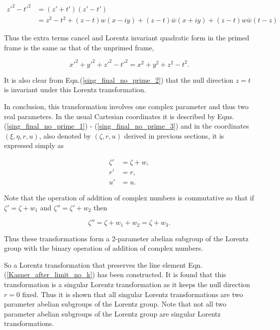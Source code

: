 \begin{align*}
{z'}^2 - {t'}^2 & = (z' + t')(z' - t') \\
& = z^2 - t^2 + (z - t)w(x-iy) + (z-t)\bar{w}(x+iy) + (z -t)w\bar{w}(t-z)
\end{align*}

\noindent Thus the extra terms cancel and Lorentz invariant quadratic form in the primed frame is the same as that of the unprimed frame,

\begin{equation*} 
{x'}^2 + {y'}^2 + {z'}^2 - {t'}^2 = {x}^2 + {y}^2 + {z}^2 - {t}^2.
\end{equation*} 

\noindent It is also clear from Eqn.(\ref{sing_final_no_prime_2}) that the null direction $z = t$ is invariant under this Lorentz transformation.

In conclusion, this transformation involves one complex parameter and thus two real parameters. In the usual Cartesian coordinates it is described by Eqns.(\ref{sing_final_no_prime_1}) - (\ref{sing_final_no_prime_3}) and in the coordinates $(\xi, \eta, r, u)$, also denoted by $(\zeta, r,u)$ derived in previous sections, it is expressed simply as

\begin{align*}
\zeta' & = \zeta + w, \\
r' & = r, \\
u' & = u.
\end{align*}

Note that the operation of addition of complex numbers is commutative so that if $\zeta' = \zeta + w_1$ and $\zeta'' = \zeta' + w_2$ then

\begin{equation*} 
\zeta'' = \zeta + w_1 + w_2 = \zeta + w_3.
\end{equation*} 
 
\noindent Thus these transformations form a 2-parameter abelian subgroup of the Lorentz group with the binary operation of addition of complex numbers.

So a Lorentz transformation that preserves the line element Eqn.(\ref{Kasner_after_limit_no_k}) has been constructed. It is found that this transformation is a singular Lorentz transformation as it keeps the null direction $r=0$ fixed. Thus it is shown that all singular Lorentz transformations are two parameter abelian subgroups of the Lorentz group. Note that not all two parameter abelian subgroups of the Lorentz group are singular Lorentz transformations.  






